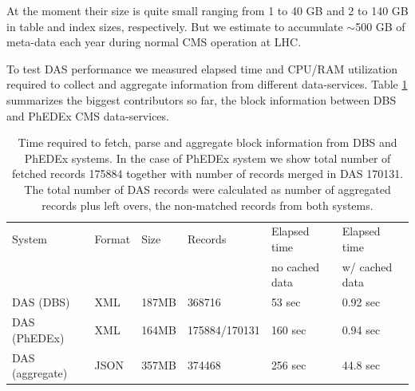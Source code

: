\documentclass[1p,times]{elsarticle}
\begin{document}
At the moment their size is quite small ranging from 1 to 40 GB and 2 to 140 GB in
table and index sizes, respectively. But we estimate to accumulate $\sim$500 GB of 
meta-data each year during normal CMS operation at LHC.

To test DAS performance we measured elapsed time and CPU/RAM utilization
required to collect and aggregate information from different
data-services. Table \ref{DAS_benchmark} summarizes the biggest 
contributors so far, the block information between DBS and 
PhEDEx CMS data-services. 

\begin{table}[hbt]
\centering
\begin{tabular}{llllll}\hline
\hline
System & Format & Size & Records & Elapsed time & Elapsed time \\
& & & & no cached data & w/ cached data \\
\hline
DAS (DBS) & XML & 187MB & 368716 & 53 sec & 0.92 sec \\
DAS (PhEDEx) & XML & 164MB & 175884/170131 & 160 sec & 0.94 sec \\
DAS (aggregate) & JSON & 357MB & 374468 & 256 sec & 44.8 sec \\
\hline
\hline
\end{tabular}
\caption{Time required to fetch, parse and aggregate block information
from DBS and PhEDEx systems. In the case of PhEDEx
system we show total number of fetched records 175884 together with
number of records merged in DAS 170131. The total number of DAS records 
were calculated as number of aggregated records plus left overs,
the non-matched records from both systems.}
\label{DAS_benchmark}
\end{table}
\end{document}
